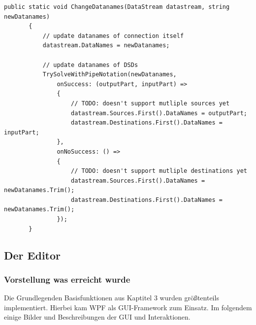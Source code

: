\documentclass[11pt]{article}
\begin{document}
\begin{enumerate}
\begin{verbatim}
public static void ChangeDatanames(DataStream datastream, string newDatanames)
       {
           // update datanames of connection itself
           datastream.DataNames = newDatanames;

           // update datanames of DSDs
           TrySolveWithPipeNotation(newDatanames,
               onSuccess: (outputPart, inputPart) =>
               {
                   // TODO: doesn't support mutliple sources yet
                   datastream.Sources.First().DataNames = outputPart;
                   datastream.Destinations.First().DataNames = inputPart;
               },
               onNoSuccess: () =>
               {
                   // TODO: doesn't support mutliple destinations yet
                   datastream.Sources.First().DataNames = newDatanames.Trim();
                   datastream.Destinations.First().DataNames = newDatanames.Trim();
               });
       }
\end{verbatim}
\end{enumerate}



\subsection{Der Editor}
\label{sec:orgheadline32}
\subsubsection{Vorstellung was erreicht wurde}
\label{sec:orgheadline22}

Die Grundlegenden Basisfunktionen aus Kaptitel 3 wurden größtenteils
implementiert. Hierbei kam WPF als GUI-Framework zum Einsatz.
Im folgendem einige Bilder und Beschreibungen der GUI und Interaktionen.
\end{document}
